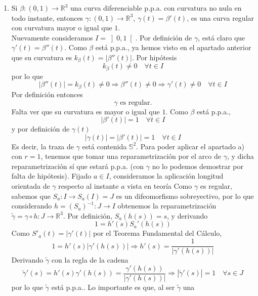 \documentclass[12pt]{article}
\newcommand{\R}{\mathbb{R}}
\newcommand{\Ss}{\mathbb{S}}
\begin{document}
\begin{ejercicio}
\begin{enumerate}
            \newpage

            \item[b)] Si $\beta : (0,1) \to \mathbb{R}^3$ una curva diferenciable p.p.a. con curvatura no nula en todo 
            instante, entonces $\gamma : (0,1) \to \mathbb{R}^3$, $\gamma(t)=\beta'(t)$, es una curva regular con 
            curvatura mayor o igual que $1$. \\

            Nuevamente consideramos $I = \left]0,1 \right[$. Por definición de $\gamma$, está claro que $\gamma'(t) = \beta''(t)$. 
            Como $\beta$ está p.p.a., ya hemos visto en el apartado anterior que su curvatura es $k_\beta(t) = |\beta''(t)|$. Por hipótesis
            $$k_\beta(t) \neq 0 \quad \forall t \in I$$
            por lo que 
            $$|\beta''(t)| = k_\beta(t) \neq 0 \Longrightarrow \beta''(t) \neq 0 \Longrightarrow \gamma'(t) \neq 0 \quad \forall t 
            \in I$$
            Por definición entonces $$\boxed{\gamma \text{ es regular.}}$$
            Falta ver que su curvatura es mayor o igual que $1$. Como $\beta$ está p.p.a., 
            $$|\beta'(t)| = 1 \quad \forall t \in I$$ 
            y por definición de $\gamma(t)$
            $$|\gamma(t)| = |\beta'(t)| = 1 \quad \forall t \in I$$
            Es decir, la traza de $\gamma$ está contenida $\Ss^2$. Para poder aplicar el apartado a) con $r = 1$, 
            tenemos que tomar una reparametrización por el arco de $\gamma$, y dicha reparametrización
            sí que estará p.p.a. (con $\gamma$ no lo podemos demostrar por falta de hipótesis). Fijado $a \in 
            I$, consideramos la aplicación longitud orientada de $\gamma$ respecto al instante $a$
            vista en teoría
            \Func{S_a}{I}{\R}{t}{S_a(t) := \int_{a}^{t} |\gamma'(u)| du}
            Como $\gamma$ es regular, sabemos que $S_a : I \to S_a(I) = J$ es un difeomorfismo sobreyectivo, por
            lo que considerando $h = (S_a)^{-1} : J \to I$ obtenemos la reparametrización $\tilde{\gamma} = \gamma 
            \circ h : J \to \R^3$. Por definición, $S_a(h(s)) = s$, y derivando $$1 = h'(s)S_a'(h(s))$$
            Como $S'_a(t) = |\gamma'(t)|$ por el Teorema Fundamental del Cálculo, $$1 = h'(s)|\gamma'(h(s))| \Longrightarrow
            h'(s) = \dfrac{1}{|\gamma'(h(s))|}$$
            Derivando $\tilde{\gamma}$ con la regla de la cadena
            $$\tilde{\gamma}'(s) = h'(s) \gamma'(h(s)) = \dfrac{\gamma'(h(s))}{|\gamma'(h(s))|} \Longrightarrow
            |\tilde{\gamma}'(s)| = 1 \quad \forall s \in J$$
            por lo que $\tilde{\gamma}$ está p.p.a.. Lo importante es que, al ser $\tilde{\gamma}$ una 

\end{enumerate}
\end{ejercicio}
\end{document}
